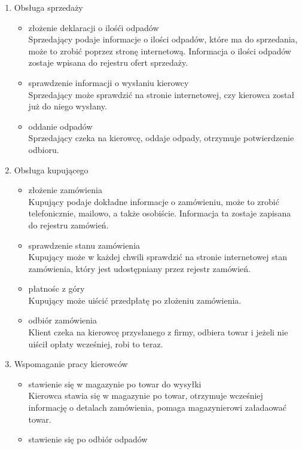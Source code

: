 
\begin{enumerate}
	\item Obsługa sprzedaży
		\begin{itemize}
		\item złożenie deklaracji o ilośći odpadów \\
		Sprzedający podaje informacje o ilości odpadów, które ma do sprzedania, może to zrobić poprzez stronę internetową. Informacja o ilości odpadów zostaje wpisana do rejestru ofert sprzedaży.
		\item sprawdzenie informacji o wysłaniu kierowcy \\ 
		Sprzedający może sprawdzić na stronie internetowej, czy kierowca został już do niego wysłany.
		\item oddanie odpadów \\
		Sprzedający czeka na kierowcę, oddaje odpady, otrzymuje potwierdzenie odbioru.
		\end{itemize}
	\item Obsługa kupującego
		\begin{itemize}
		\item złożenie zamówienia \\
		Kupujący podaje dokładne informacje o zamówieniu, może to zrobić telefonicznie, mailowo, a także osobiście. Informacja ta zostaje zapisana do rejestru zamówień.
		\item sprawdzenie stanu zamówienia \\ 
		Kupujący może w każdej chwili sprawdzić na stronie internetowej stan zamówienia, który jest udostępniany przez rejestr zamówień.
		\item płatnośc z góry \\
		Kupujący może uiścić przedpłatę po złożeniu zamówienia.
		\item odbiór zamówienia \\
		Klient czeka na kierowcę przysłanego z firmy, odbiera towar i jeżeli nie uiścił opłaty wcześniej, robi to teraz.
		\end{itemize}
	\item Wspomaganie pracy kierowców 
		\begin{itemize}
		\item stawienie się w magazynie po towar do wysyłki \\ 
		Kierowca stawia się w magazynie po towar, otrzymuje wcześniej informację o detalach zamówienia, pomaga magazynierowi załadaować towar.
		\item stawienie się po odbiór odpadów \\

\end{itemize}
\end{enumerate}
